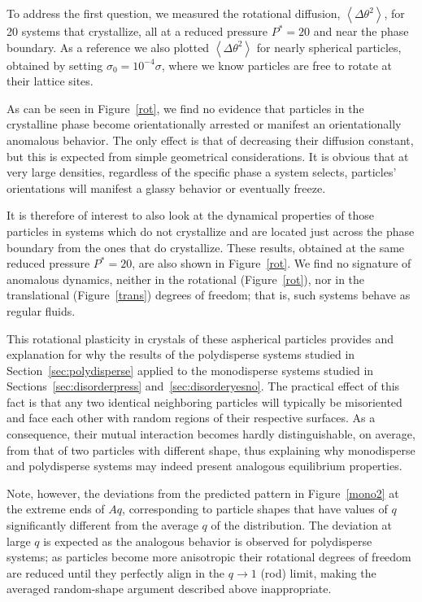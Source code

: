 To address the first question, we measured the rotational diffusion, $\left<\Delta\theta^2\right>$, for 20 systems 
that crystallize, all at a reduced pressure $P^* = 20$ and near the phase boundary.  As a reference 
we also plotted  $\left<\Delta\theta^2\right>$ for nearly spherical particles, obtained by setting $\sigma_0 = 10^{-4}\sigma$, 
where we know particles are free to rotate at their lattice sites.

As can be seen in Figure~\ref{rot}, we find no evidence that particles in the crystalline phase become 
orientationally arrested or manifest an orientationally anomalous behavior. The only effect is that of decreasing their diffusion constant, 
but this is expected from simple geometrical considerations. It is obvious that at very large densities, 
regardless of the specific phase a system selects, particles' orientations will manifest a glassy behavior or eventually freeze.~\cite{schweitzer} 

It is therefore of interest to also look at the dynamical
properties of those particles in systems which do not crystallize and are located 
just across the phase boundary from the ones that do crystallize. 
These results, obtained at the same reduced pressure $P^*=20$, are also shown in Figure~\ref{rot}. 
We find no signature of anomalous dynamics, neither in the rotational (Figure~\ref{rot}), nor in the translational 
(Figure~\ref{trans}) degrees of freedom; that is, such systems behave as regular fluids.

This rotational plasticity in crystals of these aspherical particles provides and explanation for why the results of the polydisperse systems studied in Section~\ref{sec:polydisperse} applied to the monodisperse systems studied in Sections~\ref{sec:disorderpress} and~\ref{sec:disorderyesno}.
The practical effect of this fact is  
that any two identical neighboring particles will typically be misoriented and face each other with random regions of their respective surfaces. 
As a consequence, their mutual interaction becomes  hardly distinguishable, on average, from that of two particles with different shape, thus explaining why monodisperse and polydisperse 
systems may indeed present analogous equilibrium properties. 

Note, however, the deviations from the predicted pattern in Figure~\ref{mono2}
 at  the extreme ends of $Aq$,  corresponding to particle shapes that have values of $q$ significantly 
different from the average $q$ of the distribution. The deviation at large $q$ is expected as the analogous behavior is observed for polydisperse systems;
as particles become more anisotropic their rotational degrees of freedom are reduced until they perfectly align in the $q\rightarrow 1$ (rod) limit, making 
the averaged random-shape argument described above inappropriate.

